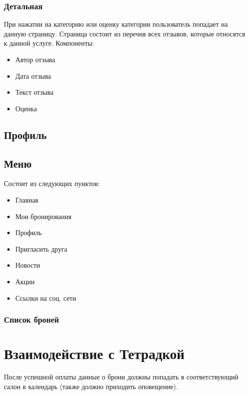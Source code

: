 \documentclass[DIV=calc, paper=a4, fontsize=11pt]{scrartcl} %
\begin{document}
\subsubsection{Детальная}
При нажатии на категорию или оценку категории пользователь попадает на данную страницу. Страница состоит из перечня всех отзывов, которые относятся к данной услуге. Компоненты:

\begin{itemize}
	\item Автор отзыва
	\item Дата отзыва
	\item Текст отзыва
	\item Оценка 
\end{itemize}

\subsection{Профиль}

\subsection{Меню}
Состоит из следующих пунктов:

\begin{itemize}
	\item Главная
	\item Мои бронирования
	\item Профиль
	\item Пригласить друга
	\item Новости
	\item Акции
	\item Ссылки на соц. сети
\end{itemize}

\subsubsection{Список броней}

\section{Взаимодействие с Тетрадкой}
После успешной оплаты данные о брони должны попадать в соответствующий салон в календарь (также должно приходить оповещение).
\end{document}
